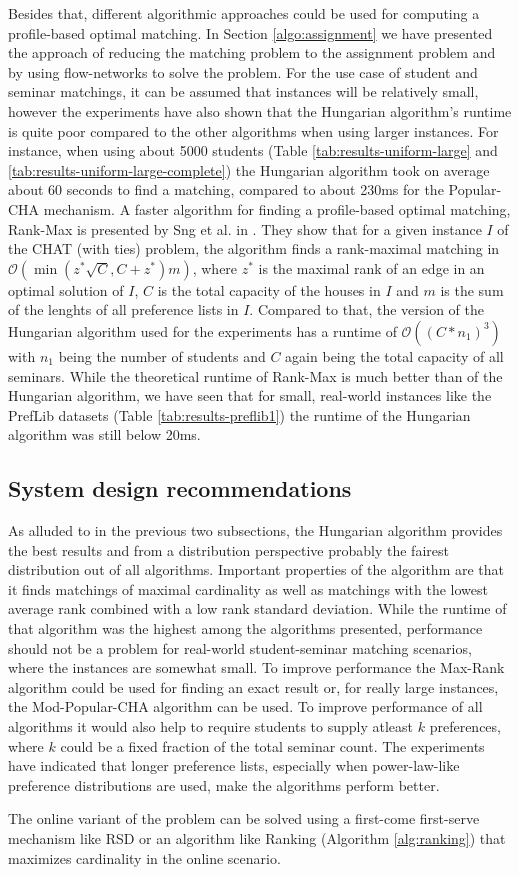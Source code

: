 Besides that, different algorithmic approaches could be used for computing a profile-based optimal matching. In Section \ref{algo:assignment} we have presented the approach of reducing the matching problem to the assignment problem and by using flow-networks to solve the problem. For the use case of student and seminar matchings, it can be assumed that instances will be relatively small, however the experiments have also shown that the Hungarian algorithm's runtime is quite poor compared to the other algorithms when using larger instances. For instance, when using about 5000 students (Table \ref{tab:results-uniform-large} and \ref{tab:results-uniform-large-complete})
the Hungarian algorithm took on average about 60 seconds to find a matching, compared to about 230ms for the Popular-CHA mechanism. A faster algorithm for finding a profile-based optimal matching, Rank-Max is presented by Sng et al. in \cite{SngThesis}. They show that for a given instance $I$ of the CHAT (with ties) problem, the algorithm finds a rank-maximal matching in $\mathcal{O}(\min(z^*\sqrt{C}, C + z^*)m)$, where $z^*$ is the maximal rank of an edge in an optimal solution of $I$, $C$ is the total capacity of the houses in $I$ and $m$ is the sum of the lenghts of all preference lists in $I$. Compared to that, the version of the Hungarian algorithm used for the experiments has a runtime of $\mathcal{O}((C*n_1)^3)$ with $n_1$ being the number of students and $C$ again being the total capacity of all seminars. While the theoretical runtime of Rank-Max is much better than of the Hungarian algorithm, we have seen that for small, real-world instances like the PrefLib datasets (Table \ref{tab:results-preflib1}) the runtime of the Hungarian algorithm was still below 20ms.

\subsection{System design recommendations}
As alluded to in the previous two subsections, the Hungarian algorithm provides the best results and from a distribution perspective probably the fairest distribution out of all algorithms. Important properties of the algorithm are that it finds matchings of maximal cardinality as well as matchings with the lowest average rank combined with a low rank standard deviation. While the runtime of that algorithm was the highest among the algorithms presented, performance should not be a problem for real-world student-seminar matching scenarios, where the instances are somewhat small. To improve performance the Max-Rank algorithm \cite{SngThesis} could be used for finding an exact result or, for really large instances, the Mod-Popular-CHA algorithm can be used. To improve performance of all algorithms it would also help to require students to supply atleast $k$ preferences, where $k$ could be a fixed fraction of the total seminar count. The experiments have indicated that longer preference lists, especially when power-law-like preference distributions are used, make the algorithms perform better.

The online variant of the problem can be solved using a first-come first-serve mechanism like RSD or an algorithm like Ranking (Algorithm \ref{alg:ranking}) that maximizes cardinality in the online scenario.
